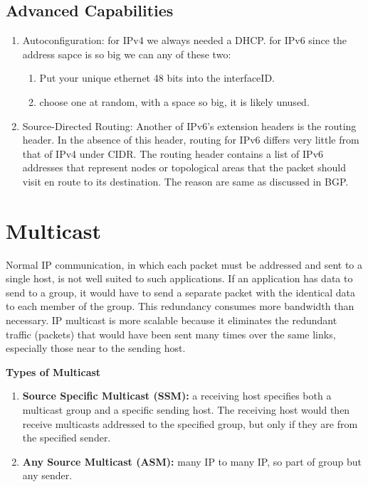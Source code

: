 \documentclass[12pt]{book}
\begin{document}
\subsection{Advanced Capabilities}
\begin{enumerate}
    \item Autoconfiguration: for IPv4 we always needed a DHCP. for IPv6 since the address sapce is so big we can any of these two:
    \begin{enumerate}
        \item Put your unique ethernet 48 bits into the interfaceID.
        \item choose one at random, with a space so big, it is likely unused.
    \end{enumerate}
    \item Source-Directed Routing: Another of IPv6’s extension headers is the routing header. In the absence of this header, routing for IPv6 differs very little from that of IPv4 under CIDR. The routing header contains a list of IPv6 addresses that represent nodes or topological areas that the packet should visit en route to its destination. The reason are same as discussed in BGP.
\end{enumerate}

\section{Multicast}
Normal IP communication, in which each packet must be addressed and sent to a single host, is not well suited to such applications. If an application has data to send to a group, it would have to send a separate packet with the identical data to each member of the group. This redundancy consumes more bandwidth than necessary. IP multicast is more scalable because it eliminates the redundant traffic (packets) that would have been sent many times over the same links, especially those near to the sending host.

\textbf{Types of Multicast}
\begin{enumerate}
    \item \textbf{Source Specific Multicast (SSM):} a receiving host specifies both a multicast group and a specific sending host. The receiving host would then receive multicasts addressed to the specified group, but only if they are from the specified sender.
    \item \textbf{Any Source Multicast (ASM):} many IP to many IP, so part of group but any sender.
\end{enumerate}
\end{document}
